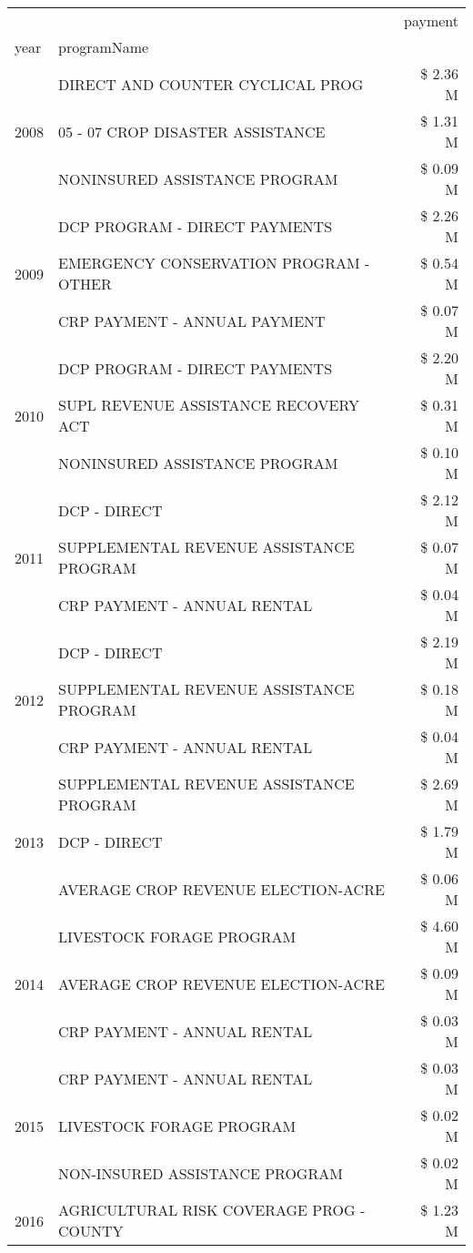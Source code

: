 \begin{tabular}{llr}
\toprule
 &  & payment \\
year & programName &  \\
\midrule
\multirow[t]{3}{*}{2008} & DIRECT AND COUNTER CYCLICAL PROG & \$ 2.36 M \\
 & 05 - 07 CROP DISASTER ASSISTANCE & \$ 1.31 M \\
 & NONINSURED ASSISTANCE PROGRAM & \$ 0.09 M \\
\cline{1-3}
\multirow[t]{3}{*}{2009} & DCP PROGRAM - DIRECT PAYMENTS & \$ 2.26 M \\
 & EMERGENCY CONSERVATION PROGRAM - OTHER & \$ 0.54 M \\
 & CRP PAYMENT - ANNUAL PAYMENT & \$ 0.07 M \\
\cline{1-3}
\multirow[t]{3}{*}{2010} & DCP PROGRAM - DIRECT PAYMENTS & \$ 2.20 M \\
 & SUPL REVENUE ASSISTANCE RECOVERY ACT & \$ 0.31 M \\
 & NONINSURED ASSISTANCE PROGRAM & \$ 0.10 M \\
\cline{1-3}
\multirow[t]{3}{*}{2011} & DCP - DIRECT & \$ 2.12 M \\
 & SUPPLEMENTAL REVENUE ASSISTANCE PROGRAM & \$ 0.07 M \\
 & CRP PAYMENT - ANNUAL RENTAL & \$ 0.04 M \\
\cline{1-3}
\multirow[t]{3}{*}{2012} & DCP - DIRECT & \$ 2.19 M \\
 & SUPPLEMENTAL REVENUE ASSISTANCE PROGRAM & \$ 0.18 M \\
 & CRP PAYMENT - ANNUAL RENTAL & \$ 0.04 M \\
\cline{1-3}
\multirow[t]{3}{*}{2013} & SUPPLEMENTAL REVENUE ASSISTANCE PROGRAM & \$ 2.69 M \\
 & DCP - DIRECT & \$ 1.79 M \\
 & AVERAGE CROP REVENUE ELECTION-ACRE & \$ 0.06 M \\
\cline{1-3}
\multirow[t]{3}{*}{2014} & LIVESTOCK FORAGE PROGRAM & \$ 4.60 M \\
 & AVERAGE CROP REVENUE ELECTION-ACRE & \$ 0.09 M \\
 & CRP PAYMENT - ANNUAL RENTAL & \$ 0.03 M \\
\cline{1-3}
\multirow[t]{3}{*}{2015} & CRP PAYMENT - ANNUAL RENTAL & \$ 0.03 M \\
 & LIVESTOCK FORAGE PROGRAM & \$ 0.02 M \\
 & NON-INSURED ASSISTANCE PROGRAM & \$ 0.02 M \\
\cline{1-3}
\multirow[t]{3}{*}{2016} & AGRICULTURAL RISK COVERAGE PROG - COUNTY & \$ 1.23 M \\

\end{tabular}
